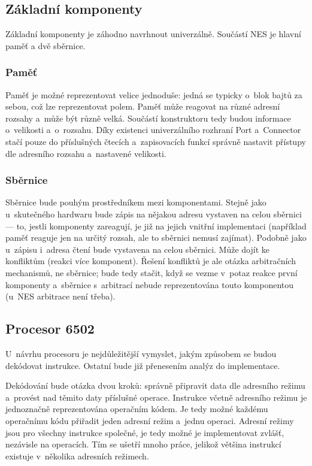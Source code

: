 \subsection{Základní komponenty}
Základní komponenty je záhodno navrhnout univerzálně. Součástí NES je hlavní paměť a dvě sběrnice.

\subsubsection{Paměť}
Paměť je možné reprezentovat velice jednoduše: jedná se typicky o~blok bajtů za sebou, což lze reprezentovat polem. Paměť může reagovat na různé adresní rozsahy a~může být různě velká. Součástí konstruktoru tedy budou informace o~velikosti a~o~rozsahu. Díky existenci univerzálního rozhraní Port a~Connector stačí pouze do příslušných čtecích a~zapisovacích funkcí správně nastavit přístupy dle adresního rozsahu a~nastavené velikosti.

\subsubsection{Sběrnice}
Sběrnice bude pouhým prostředníkem mezi komponentami. Stejně jako u~skutečného hardwaru bude zápis na nějakou adresu vystaven na celou sběrnici --- to, jestli komponenty zareagují, je již na jejich vnitřní implementaci (například paměť reaguje jen na určitý rozsah, ale to sběrnici nemusí zajímat). Podobně jako u~zápisu i~adresa čtení bude vystavena na celou sběrnici. Může dojít ke konfliktům (reakci více komponent). Řešení konfliktů je ale otázka arbitračních mechanismů, ne sběrnice; bude tedy stačit, když se vezme v~potaz reakce první komponenty a~sběrnice s~arbitrací nebude reprezentována touto komponentou (u~NES arbitrace není třeba).

\subsection{Procesor 6502}
U~návrhu procesoru je nejdůležitější vymyslet, jakým způsobem se budou dekódovat instrukce. Ostatní bude již přenesením analýz do implementace.

Dekódování bude otázka dvou kroků: správně připravit data dle adresního režimu a~provést nad těmito daty příslušné operace. Instrukce včetně adresního režimu je jednoznačně reprezentována operačním kódem. Je tedy možné každému operačnímu kódu přiřadit jeden adresní režim a~jednu operaci. Adresní režimy jsou pro všechny instrukce společné, je tedy možné je implementovat zvlášť, nezávisle na operacích. Tím se ušetří mnoho práce, jelikož většina instrukcí existuje v~několika adresních režimech.


